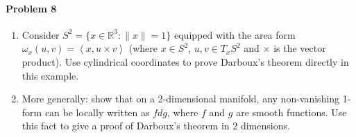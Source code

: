 \paragraph{Problem 8} \leavevmode 

\begin{enumerate}[label=\alph*.]
	\item Consider $S^{2}=\{x\in\mathbb{R}^{3}:\|x\|=1\}$ equipped with the area form $\omega_x(u,v)=\left<x,u\times v\right> $ (where $x\in S^{2}$, $u,v\in T_xS^{2}$ and $\times $ is the vector product). Use cylindrical coordinates to prove Darboux's theorem directly in this example.

	\item More generally: show that on a 2-dimensional manifold, any non-vanishing 1-form can be locally written as $fdg$, where $f$ and $g$ are smooth functions. Use this fact to give a proof of Darboux's theorem in 2 dimensions.
\end{enumerate}

